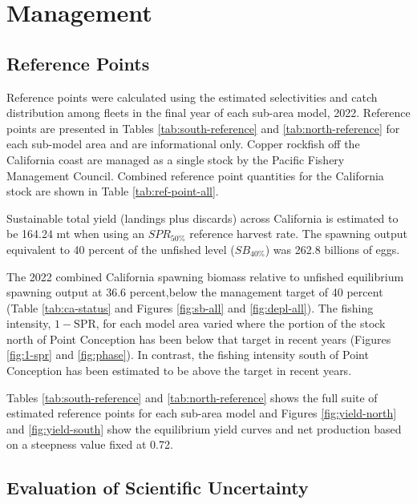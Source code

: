 \documentclass[11pt,
  english,
  letterpaper,
]{article}
\begin{document}
\hypertarget{management}{%
\section{Management}\label{management}}

\hypertarget{reference-points-1}{%
\subsection{Reference Points}\label{reference-points-1}}

Reference points were calculated using the estimated selectivities and catch distribution among fleets in the final year of each sub-area model, 2022. Reference points are presented in Tables \ref{tab:south-reference} and \ref{tab:north-reference} for each sub-model area and are informational only. Copper rockfish off the California coast are managed as a single stock by the Pacific Fishery Management Council. Combined reference point quantities for the California stock are shown in Table \ref{tab:ref-point-all}.

Sustainable total yield (landings plus discards) across California is estimated to be 164.24 mt when using an \(SPR_{50\%}\) reference harvest rate. The spawning output equivalent to 40 percent of the unfished level (\(SB_{40\%}\)) was 262.8 billions of eggs.

The 2022 combined California spawning biomass relative to unfished equilibrium spawning output at 36.6 percent,below the management target of 40 percent (Table \ref{tab:ca-status} and Figures \ref{fig:sb-all} and \ref{fig:depl-all}). The fishing intensity, \(1-\text{SPR}\), for each model area varied where the portion of the stock north of Point Conception has been below that target in recent years (Figures \ref{fig:1-spr} and \ref{fig:phase}). In contrast, the fishing intensity south of Point Conception has been estimated to be above the target in recent years.

Tables \ref{tab:south-reference} and \ref{tab:north-reference} shows the full suite of estimated reference points for each sub-area model and Figures \ref{fig:yield-north} and \ref{fig:yield-south} show the equilibrium yield curves and net production based on a steepness value fixed at 0.72.

\hypertarget{evaluation-of-scientific-uncertainty}{%
\subsection{Evaluation of Scientific Uncertainty}\label{evaluation-of-scientific-uncertainty}}
\end{document}
